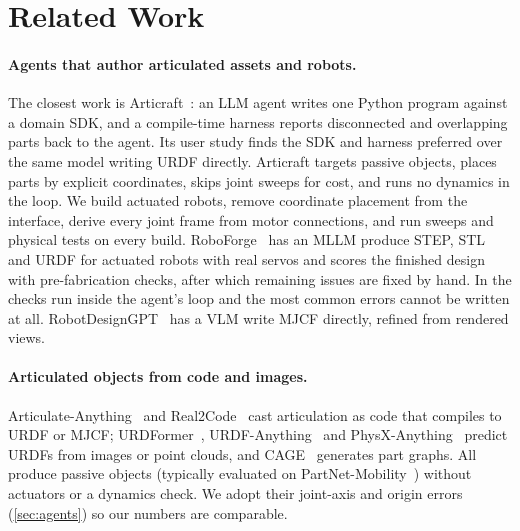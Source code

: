 \section{Related Work}
\label{sec:related}

\paragraph{Agents that author articulated assets and robots.}
The closest work is Articraft~\citep{zhou2026articraft}: an LLM agent writes one Python program
against a domain SDK, and a compile-time harness reports disconnected and overlapping parts back to
the agent. Its user study finds the SDK and harness preferred over the same model writing URDF
directly. Articraft targets passive objects, places parts by explicit coordinates, skips joint
sweeps for cost, and runs no dynamics in the loop. We build actuated robots, remove coordinate
placement from the interface, derive every joint frame from motor connections, and run sweeps and
physical tests on every build. RoboForge~\citep{li2026roboforge} has an MLLM produce STEP, STL and
URDF for actuated robots with real servos and scores the finished design with pre-fabrication
checks, after which remaining issues are fixed by hand. In \ms the checks run inside the agent's
loop and the most common errors cannot be written at all. RobotDesignGPT~\citep{sontakke2026robotdesigngpt}
has a VLM write MJCF directly, refined from rendered views.

\paragraph{Articulated objects from code and images.}
Articulate-Anything~\citep{le2025articulateanything} and Real2Code~\citep{mandi2025real2code} cast
articulation as code that compiles to URDF or MJCF; URDFormer~\citep{chen2024urdformer},
URDF-Anything~\citep{li2025urdfanything} and PhysX-Anything~\citep{cao2026physxanything} predict
URDFs from images or point clouds, and CAGE~\citep{liu2024cage} generates part graphs. All produce
passive objects (typically evaluated on PartNet-Mobility~\citep{xiang2020sapien}) without
actuators or a dynamics check. We adopt their joint-axis and origin errors
(\cref{sec:agents}) so our numbers are comparable.

